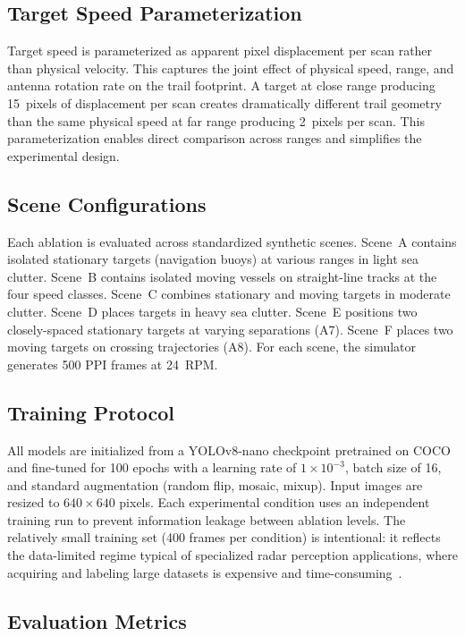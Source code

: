 \documentclass[twocolumn, 10pt]{article}
\begin{document}
\subsection{Target Speed Parameterization}

Target speed is parameterized as apparent pixel displacement per scan rather than physical velocity. This captures the joint effect of physical speed, range, and antenna rotation rate on the trail footprint. A target at close range producing 15~pixels of displacement per scan creates dramatically different trail geometry than the same physical speed at far range producing 2~pixels per scan. This parameterization enables direct comparison across ranges and simplifies the experimental design.

\subsection{Scene Configurations}

Each ablation is evaluated across standardized synthetic scenes. Scene~A contains isolated stationary targets (navigation buoys) at various ranges in light sea clutter. Scene~B contains isolated moving vessels on straight-line tracks at the four speed classes. Scene~C combines stationary and moving targets in moderate clutter. Scene~D places targets in heavy sea clutter. Scene~E positions two closely-spaced stationary targets at varying separations (A7). Scene~F places two moving targets on crossing trajectories (A8). For each scene, the simulator generates 500 PPI frames at 24~RPM.

\subsection{Training Protocol}

All models are initialized from a YOLOv8-nano checkpoint pretrained on COCO and fine-tuned for 100 epochs with a learning rate of $1 \times 10^{-3}$, batch size of 16, and standard augmentation (random flip, mosaic, mixup). Input images are resized to $640 \times 640$ pixels. Each experimental condition uses an independent training run to prevent information leakage between ablation levels. The relatively small training set (400 frames per condition) is intentional: it reflects the data-limited regime typical of specialized radar perception applications, where acquiring and labeling large datasets is expensive and time-consuming~\cite{Shorten2019DataAugmentation}.

\subsection{Evaluation Metrics}
\end{document}
